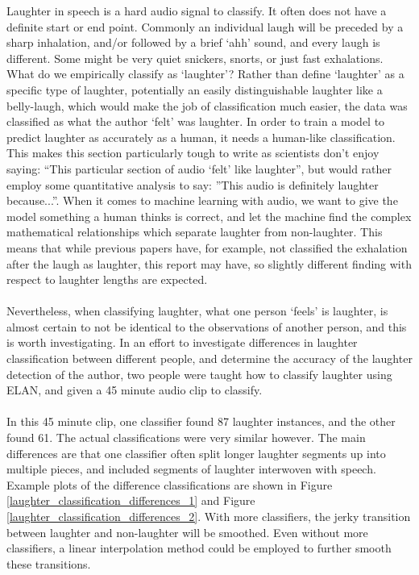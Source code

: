 \documentclass[a4paper,11pt,notitlepage]{article}
\begin{document}
\noindent
Laughter in speech is a hard audio signal to classify. It often does not have a definite start or end point. Commonly an individual laugh will be preceded by a sharp inhalation, and/or followed by a brief `ahh' sound, and every laugh is different. Some might be very quiet snickers, snorts, or just fast exhalations. What do we empirically classify as `laughter'? Rather than define `laughter' as a specific type of laughter, potentially an easily distinguishable laughter like a belly-laugh, which would make the job of classification much easier, the data was classified as what the author `felt' was laughter. In order to train a model to predict laughter as accurately as a human, it needs a human-like classification. This makes this section particularly tough to write as scientists don't enjoy saying: ``This particular section of audio `felt' like laughter'', but would rather employ some quantitative analysis to say: ''This audio is definitely laughter because...''. When it comes to machine learning with audio, we want to give the model something a human thinks is correct, and let the machine find the complex mathematical relationships which separate laughter from non-laughter. This means that while previous papers have, for example, not classified the exhalation after the laugh as laughter\cite{bachorowski2001acoustic}, this report may have, so slightly different finding with respect to laughter lengths are expected.\\
\\
Nevertheless, when classifying laughter, what one person `feels' is laughter, is almost certain to not be identical to the observations of another person, and this is worth investigating. In an effort to investigate differences in laughter classification between different people, and determine the accuracy of the laughter detection of the author, two people were taught how to classify laughter using ELAN, and given a 45 minute audio clip to classify.\\
\\
In this 45 minute clip, one classifier found 87 laughter instances, and the other found 61. The actual classifications were very similar however. The main differences are that one classifier often split longer laughter segments up into multiple pieces, and included segments of laughter interwoven with speech. Example plots of the difference classifications are shown in Figure \ref{laughter_classification_differences_1} and Figure \ref{laughter_classification_differences_2}. With more classifiers, the jerky transition between laughter and non-laughter will be smoothed. Even without more classifiers, a linear interpolation method could be employed to further smooth these transitions.
\end{document}
